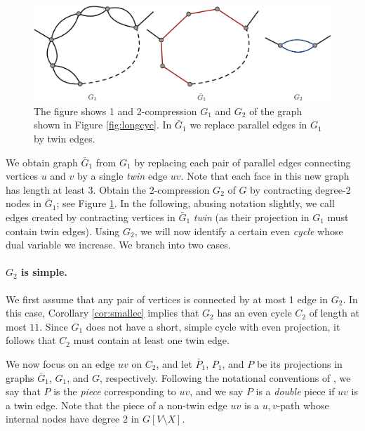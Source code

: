 \documentclass{article}
\newcommand{\0}{\mathbb{0}}
\newcommand{\1}{\mathbb{1}}
\begin{document}
\begin{figure}[ht]
  \begin{center}
    \includegraphics[width=.85\textwidth]{2compress.pdf}
  \end{center}
  \caption{\label{fig:2compress} The figure shows 1 and 2-compression
    $G_1$ and $G_2$ of the graph shown in Figure \ref{fig:longcyc}. In $\bar{G}_1$ we replace parallel
    edges in $G_1$ by twin edges. }
\end{figure}

We obtain graph $\bar{G}_1$ from $G_1$ by replacing each pair of parallel edges
connecting vertices $u$ and $v$ by a single {\em twin} edge $uv$.
Note that each face in this new graph has length at least 3.
Obtain the 2-compression $G_2$ of
$G$ by contracting degree-2 nodes in $\bar{G}_1$; see Figure
\ref{fig:2compress}. In the following, abusing notation slightly, we
call edges created by contracting vertices in $\bar{G}_1$ {\em
twin} (as their projection in $G_1$ must contain twin edges). Using $G_2$, we will now
identify a certain even {\em cycle} whose dual variable we increase. 
We branch into two
cases. 

\paragraph{$G_2$ is simple.}

We first assume that any pair of vertices is connected by at most 1 edge in $G_2$. 
In this case, Corollary \ref{cor:smallec} implies that $G_2$ has an even cycle $C_2$ 
of length at most $11$. Since $G_1$ does not have a short, simple cycle with even
projection, it follows that $C_2$ must contain at least one twin edge.

We now focus on an edge $uv$ on $C_2$, and let $\bar{P}_1$, $P_1$, and $P$
be its projections in graphs $\bar{G}_1$, $G_1$, and $G$, respectively.  
Following the notational conventions of 
\cite{FJP10}, we say that $P$ is the {\em piece} corresponding to $uv$, and we say $P$ is a \emph{double} piece if $uv$ is a twin edge. 
Note that the piece of a non-twin edge $uv$ is a $u,v$-path whose
internal nodes have degree $2$ in $G[V\setminus X]$.
\end{document}

